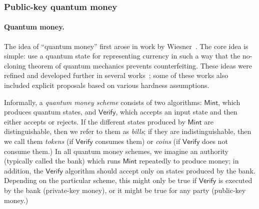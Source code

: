 \documentclass[envcountsame]{llncs}
\numberwithin{equation}{section}
\newcommand{\expref}[2]{\texorpdfstring{\hyperref[#2]{#1~\ref{#2}}}{#1~\ref{#2}}}
\newcommand{\Mint}{\ensuremath{\mathsf{Mint}}\xspace}
\newcommand{\Verify}{\ensuremath{\mathsf{Verify}}\xspace}
\begin{document}



\subsubsection{Public-key quantum money}

\paragraph{Quantum money.}
The idea of ``quantum money'' first arose in work by Wiesner~\cite{Wie1983}. The core idea is simple: use a quantum state for representing currency in such a way that the no-cloning theorem of quantum mechanics prevents counterfeiting. These ideas were refined and developed further in several works~\cite{Aar09, AC12, BBBW83, FGHLS12, MS10}; some of these works also included explicit proposals based on various hardness assumptions. 

Informally, a \emph{quantum money scheme} consists of two algorithms: \Mint, which produces quantum states, and \Verify, which accepts an input state and then either accepts or rejects. If the different states produced by \Mint are distinguishable, then we refer to them as \emph{bills}; if they are indistinguishable, then we call them \emph{tokens} (if \Verify consumes them) or \emph{coins} (if \Verify does not consume them.) In all quantum money schemes, we imagine an authority (typically called the bank) which runs \Mint repeatedly to produce money; in addition, the \Verify algorithm should accept only on states produced by the bank. Depending on the particular scheme, this might only be true if \Verify is executed by the bank (private-key money), or it might be true for any party (public-key money.)
\end{document}
